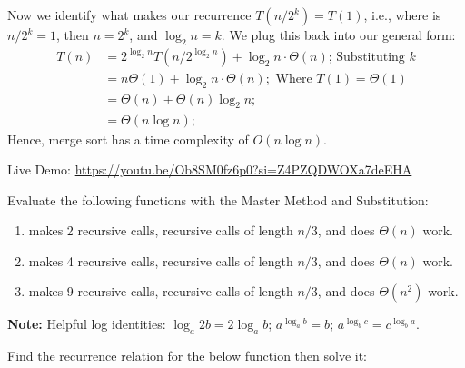 \begin{Proof}
\vspace{-1.5em}
\noindent
Now we identify what makes our recurrence $T(n/2^k) = T(1)$, i.e., where is $n/2^k = 1$, then $n=2^k$, and $\log_2 n = k$. We plug this back into our general form:
\begin{align*}
    T(n) &= 2^{\log_2 n}T(n/2^{\log_2 n}) + \log_2 n\cdot \Theta(n)\text{; Substituting $k$}\\
    &= n\Theta(1) + \log_2 n\cdot\Theta(n);\text{ Where $T(1)=\Theta(1)$}\\
    &= \Theta(n) + \Theta(n)\log_2 n;\\
    &= \Theta(n\log n);
\end{align*}
Hence, merge sort has a time complexity of $O(n\log n)$.

\end{Proof}

\begin{Tip}
    Live Demo: \url{https://youtu.be/Ob8SM0fz6p0?si=Z4PZQDWOXa7deEHA}
\end{Tip}

\newpage 

\begin{Exercise} Evaluate the following functions with the Master Method and Substitution:
    \begin{enumerate}
        \item makes 2 recursive calls, recursive calls of length $n/3$, and does $\Theta(n)$ work.
        \item makes 4 recursive calls, recursive calls of length $n/3$, and does $\Theta(n)$ work.
        \item makes 9 recursive calls, recursive calls of length $n/3$, and does $\Theta(n^2)$ work.
    \end{enumerate}
\end{Exercise}

\vspace{-.5em}
\begin{Note}
    \textbf{Note:} Helpful log identities: $\log_a 2b = 2\log_a b$; $a^{\log_a b} = b$; $a^{\log_b c} = c^{\log_b a}$.
\end{Note}

\begin{Exercise} Find the recurrence relation for the below function then solve it:
\end{Exercise}

\vspace{-.5em}
\begin{Func}

    \vspace{-1em}
    \begin{algorithm}[H]
    \end{algorithm}
\end{Func}

